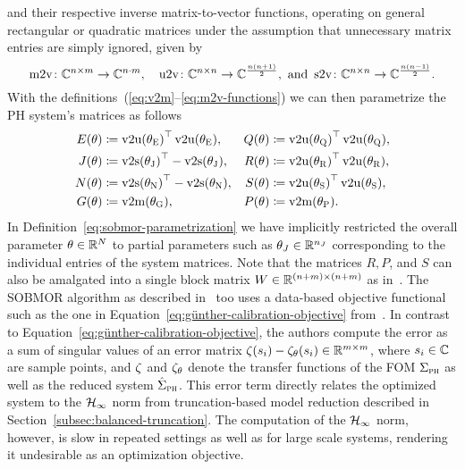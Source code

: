 and their respective inverse matrix-to-vector functions, operating on general rectangular or quadratic matrices under the assumption that unnecessary matrix entries are simply ignored, given by
\begin{equation}\label{eq:m2v-functions}
    \mathop{}\!\mathrm{m}2\mathrm{v} \colon \mathbb{C}^{n \times m} \to \mathbb{C}^{n \cdot m},\quad \mathop{}\!\mathrm{u}2\mathrm{v} \colon \mathbb{C}^{n \times n} \to \mathbb{C}^{\frac{n (n + 1)}{2}}, \text{ and } \mathop{}\!\mathrm{s}2\mathrm{v} \colon \mathbb{C}^{n \times n} \to \mathbb{C}^{\frac{n (n - 1)}{2}}.
\end{equation}
With the definitions~(\ref{eq:v2m}--\ref{eq:m2v-functions}) we can then parametrize the \ac{PH} system's matrices as follows
\begin{equation}\label{eq:sobmor-parametrization}
    \begin{alignedat}{3}
        E(\theta) &\coloneqq {\vecupper(\theta_\msc{E})}\trans \vecupper(\theta_\msc{E}),\quad &Q(\theta) &\coloneqq {\vecupper(\theta_\msc{Q})}\trans \vecupper(\theta_\msc{Q}), \\
        J(\theta) &\coloneqq {\vecstrict(\theta_\msc{J})}\trans - \vecstrict(\theta_\msc{J}),\quad &R(\theta) &\coloneqq {\vecupper(\theta_\msc{R})}\trans \vecupper(\theta_\msc{R}), \\
        N(\theta) &\coloneqq {\vecstrict(\theta_\msc{N})}\trans - \vecstrict(\theta_\msc{N}),\quad &S(\theta) &\coloneqq {\vecupper(\theta_\msc{S})}\trans \vecupper(\theta_\msc{S}), \\
        G(\theta) &\coloneqq \vecmat(\theta_\msc{G}),\quad &P(\theta) &\coloneqq \vecmat(\theta_\msc{P}).
    \end{alignedat}
\end{equation}
In Definition~\eqref{eq:sobmor-parametrization} we have implicitly restricted the overall parameter $\theta \in \mathbb{R}^N$ to partial parameters such as $\theta_J \in \mathbb{R}^{n_J}$ corresponding to the individual entries of the system matrices.
Note that the matrices $R, P$, and $S$ can also be amalgated into a single block matrix $W \in \mathbb{R}^{(n + m) \times (n + m)}$ as in~\cite{Schwerdtner2021}.
The \ac{SOBMOR} algorithm as described in~\cite{SV2023} too uses a data-based objective functional such as the one in Equation~\eqref{eq:günther-calibration-objective} from~\cite{Günther2023}.
In contrast to Equation~\eqref{eq:günther-calibration-objective}, the authors compute the error as a sum of singular values of an error matrix $\zeta(s_i) - \zeta_\theta(s_i) \in \mathbb{R}^{m \times m}$, where $s_i \in \mathbb{C}$ are sample points, and $\zeta$ and $\zeta_\theta$ denote the transfer functions of the \ac{FOM} $\Sigma_{\textnormal{\scshape ph}}$ as well as the reduced system $\hat{\Sigma}_{\textnormal{\scshape ph}}$.
This error term directly relates the optimized system to the $\mathcal{H}_\infty$ norm from truncation-based model reduction described in Section~\ref{subsec:balanced-truncation}.
The computation of the $\mathcal{H}_\infty$ norm, however, is slow in repeated settings as well as for large scale systems, rendering it undesirable as an optimization objective.

